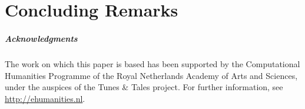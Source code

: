 \documentclass[a4paper,UKenglish]{oasics}
\begin{document}
\section{Concluding Remarks}

\subparagraph*{Acknowledgments}

The work on which this paper is based has been supported by the
Computational Humanities Programme of the Royal Netherlands Academy of
Arts and Sciences, under the auspices of the Tunes \& Tales
project. For further information, see \url{http://ehumanities.nl}.


\end{document}
